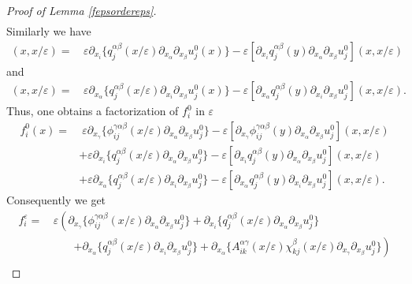 \documentclass[11pt, reqno]{amsart}
\theoremstyle{definition}
\theoremstyle{remark}
\numberwithin{equation}{section}
\begin{document}
\begin{proof}[Proof  of \textup{Lemma \ref{fepsordereps}}]
\begin{align*}
		\end{align*}
		Similarly we have 
		\begin{align*}
			[ \partial_{y_i} q^{\alpha\beta}_{j} (y)\partial_{x_\alpha}\partial_{x_\beta} u_j^0 ] (x,x/\varepsilon) =&\, \varepsilon \partial_{x_i} \{ q^{\alpha\beta}_{j}(x/\varepsilon)\partial_{x_\alpha}\partial_{x_\beta} u_j^0(x) \} - \varepsilon [  \partial_{x_i}  q^{\alpha\beta}_{j}(y)\partial_{x_\alpha}\partial_{x_\beta} u_j^0] (x,x/\varepsilon)
		\end{align*}
		and 
		\begin{align*}
			[\partial_{y_\alpha}q^{\alpha\beta}_{j}(y) \partial_{ x_i}\partial_{ x_{\beta}}  u^0_j] (x,x/\varepsilon) 		=& \,  \varepsilon \partial_{x_\alpha} \{ q^{\alpha\beta}_{j}(x/\varepsilon)\partial_{x_i}\partial_{x_\beta} u_j^0(x) \} - \varepsilon [  \partial_{x_\alpha}  q^{\alpha\beta}_{j}(y)\partial_{x_i}\partial_{x_\beta} u_j^0] (x,x/\varepsilon).
		\end{align*}
	Thus, one obtains a factorization of  $f^0_i$ in $\varepsilon$ 
		\begin{align*}
			f_i^0 (x)=&\; \varepsilon \partial_{x_\gamma} \{ \phi^{\gamma\alpha\beta}_{ij}(x/\varepsilon)\partial_{x_\alpha}\partial_{x_\beta} u_j^0 \} - \varepsilon [  \partial_{x_\gamma}  \phi^{\gamma\alpha\beta}_{ij}(y)\partial_{x_\alpha}\partial_{x_\beta} u_j^0] (x,x/\varepsilon)\\
			&	+ \varepsilon \partial_{x_i} \{ q^{\alpha\beta}_{j}(x/\varepsilon)\partial_{x_\alpha}\partial_{x_\beta} u_j^0 \} - \varepsilon [  \partial_{x_i}  q^{\alpha\beta}_{j}(y)\partial_{x_\alpha}\partial_{x_\beta} u_j^0] (x,x/\varepsilon)\\
			&	+  \varepsilon \partial_{x_\alpha} \{ q^{\alpha\beta}_{j}(x/\varepsilon)\partial_{x_i}\partial_{x_\beta} u_j^0 \} - \varepsilon [  \partial_{x_\alpha}  q^{\alpha\beta}_{j}(y)\partial_{x_i}\partial_{x_\beta} u_j^0] (x,x/\varepsilon).
		\end{align*}
	Consequently we get
		\begin{align*}
			f_i^\varepsilon
			=& \,\varepsilon \left( \partial_{x_\gamma} \{ \phi^{\gamma\alpha\beta}_{ij}(x/\varepsilon)\partial_{x_\alpha}\partial_{x_\beta} u_j^0 \}	+ \partial_{x_i} \{ q^{\alpha\beta}_{j}(x/\varepsilon)\partial_{x_\alpha}\partial_{x_\beta} u_j^0 \}\right. \\
			&\qquad \left.	+  \partial_{x_\alpha} \{ q^{\alpha\beta}_{j}(x/\varepsilon)\partial_{x_i}\partial_{x_\beta} u_j^0 \}+ \partial_{x_\alpha}\{ A^{\alpha\gamma}_{ik} (x/\varepsilon) \chi^{\beta}_{kj}(x/\varepsilon)\partial_{x_\gamma}	\partial_{ x_{\beta}}  u_j^0 \} \right)  \\

\end{align*}
\end{proof}
\end{document}

